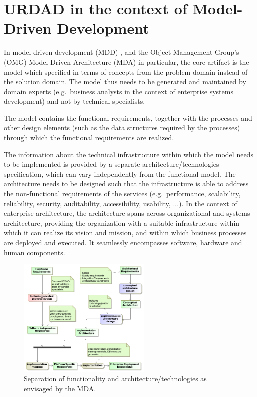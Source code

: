 \section{URDAD in the context of Model-Driven Development}
\label{sec:contextualization}

In model-driven development (MDD) \cite{stahl:mdsd, france:mddUsingUml2},
and the Object Management Group's (OMG) Model Driven Architecture
(MDA) \cite{stahl:mdsd, france:mddUsingUml2} in particular,
the core artifact is the model which specified in terms of concepts
from the problem domain instead of the solution domain.
The model thus needs to be generated and maintained by domain
experts (e.g.\ business analysts in the context of enterprise systems development)
and not by technical specialists.

The model contains the functional requirements, together with the processes 
and other design elements (such as the data structures required by the processes) through which the functional requirements are realized.

The information about the technical infrastructure within which the model needs to
be implemented is provided by a separate architecture/technologies specification, which can vary
independently from the functional model. The architecture needs to be designed such that the infrastructure
is able to address the non-functional requirements of the services (e.g.\ performance, scalability, reliability,
security, auditability, accessibility, usability, ...). In the context of enterprise architecture,
the architecture spans across organizational and systems architecture, providing the organization with a suitable infrastructure within which it can realize its vision and mission, and within which business processes
are deployed and executed. It seamlessly encompasses software, hardware and human components.

\begin{figure}[!t]
  \centering
	\includegraphics[width=2.5in]{mdaProcess}	
  \caption{Separation of functionality and architecture/technologies as envisaged by the MDA.}
  \label{fig:mda}
\end{figure}

